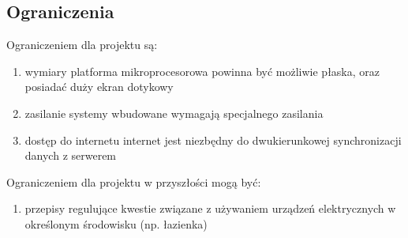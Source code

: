 \subsection{Ograniczenia} %
\label{sub:ograniczenia}
Ograniczeniem dla projektu są:
\begin{enumerate}
	\item wymiary
	\subitem platforma mikroprocesorowa powinna być możliwie płaska, oraz posiadać duży ekran dotykowy
	\item zasilanie
	\subitem systemy wbudowane wymagają specjalnego zasilania
	\item dostęp do internetu
	\subitem internet jest niezbędny do dwukierunkowej synchronizacji danych z serwerem
\end{enumerate}

Ograniczeniem dla projektu w przyszłości mogą być:
\begin{enumerate}
	\item przepisy regulujące kwestie związane z używaniem urządzeń elektrycznych w określonym środowisku (np. łazienka)
\end{enumerate}
